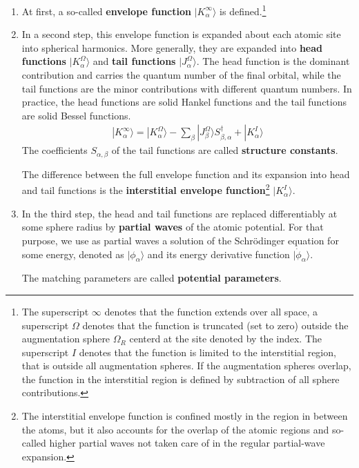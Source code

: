 \documentclass[11pt,a4paper]{report}
\begin{document}
\begin{enumerate}
\item At first, a so-called \textbf{envelope function} $|K^\infty_\alpha\rangle$ is defined.\footnote{The
  superscript $\infty$ denotes that the function extends over all
  space, a superscript $\Omega$ denotes that the function is truncated
  (set to zero) outside the augmentation sphere $\Omega_{R}$ centerd
  at the site denoted by the index. The superscript $I$ denotes that
  the function is limited to the interstitial region, that is outside
  all augmentation spheres. If the augmentation spheres overlap, the
  function in the interstitial region is defined by subtraction of all
  sphere contributions.}
%
\item In a second step, this envelope function is expanded about each
  atomic site into spherical harmonics.  More generally, they are
  expanded into \textbf{head functions}
  $|K^\Omega_\alpha\rangle$ and \textbf{tail functions} $|J^\Omega_\alpha\rangle$. The head function is the
  dominant contribution and carries the quantum number of the final
  orbital, while the tail functions are the minor contributions with
  different quantum numbers. In practice, the head functions are solid
  Hankel functions and the tail functions are solid Bessel functions.
\begin{eqnarray}
|K_{\alpha}^\infty\rangle=|K^\Omega_{\alpha}\rangle
-\sum_{\beta}|J^\Omega_{\beta}\rangle S^\dagger_{\beta,\alpha}
+|K^I_{\alpha}\rangle
\end{eqnarray}
   The coefficients $S_{\alpha,\beta}$ of the tail functions are
   called \textbf{structure constants}.

  The difference between the full envelope function and its expansion
  into head and tail functions is the \textbf{interstitial envelope
    function}\footnote{The
    interstitial envelope function is confined mostly in the region in
    between the atoms, but it also accounts for the overlap of the
    atomic regions and so-called higher partial waves not taken care of
    in the regular partial-wave expansion.}  $|K^I_\alpha\rangle$.
%
\item In the third step, the head and tail functions are replaced
  differentiably at some sphere radius by \textbf{partial
    waves} of the atomic potential. For that
  purpose, we use as partial waves a solution of the Schr\"odinger
  equation for some energy, denoted as $|\phi_{\alpha}\rangle$ and its
  energy derivative function $|\dot{\phi}_\alpha\rangle$.

  The matching parameters are called \textbf{potential
    parameters}.
\end{enumerate}
\end{document}
